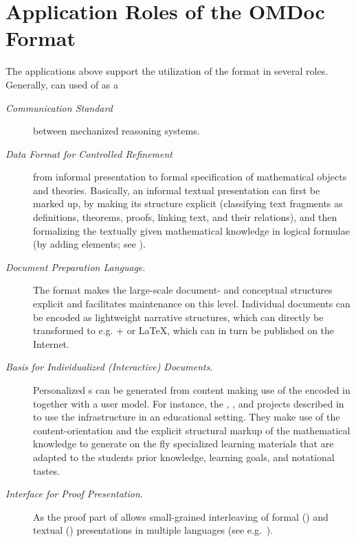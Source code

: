 \section{Application Roles of the OMDoc Format}\label{subsec:omdoc-roles}
  The applications above support the utilization of the {\omdoc} format in several
  roles. Generally, {\omdoc} can used of as a
\begin{description}
\item[\emph{Communication Standard}] between mechanized
reasoning systems.
\item[\emph{Data Format for Controlled Refinement}] from
  informal presentation to formal specification of mathematical objects and theories.
  Basically, an informal textual presentation can first be marked up, by making its
  structure explicit (classifying text fragments as
  definitions, theorems, proofs, linking text, and their relations), and then formalizing
  the textually given mathematical knowledge in logical formulae (by adding
  {} elements; see {}).
\item[\emph{Document Preparation Language}.]  The
  {\omdoc} format makes the large-scale document- and conceptual structures explicit and
  facilitates maintenance on this level. Individual documents can be encoded as
  lightweight narrative structures, which can directly be transformed to e.g.
  {\xhtml}+{\mathml} or {\LaTeX}, which can in turn be published on the Internet.
\item[\emph{Basis for Individualized (Interactive)
    Documents}.] Personalized
  {s} can be generated from {\mbase} content making use of
  the {} encoded in {\mbase} together with a user model.
  For instance, the {\mmiss}, {\MathDox}, and {\activemath} projects described in
  {} to {} use the {\omdoc} infrastructure in an educational
  setting. They make use of the content-orientation and the explicit structural markup of
  the mathematical knowledge to generate on the fly specialized learning materials that
  are adapted to the students prior knowledge, learning goals, and notational tastes.
\item[\emph{Interface for Proof Presentation}.] As the proof
  part of {\omdoc} allows small-grained interleaving of formal ({}) and
  textual ({}) presentations in multiple languages (see
  e.g.~\cite{HuangFiedler:pvip97,Fiedler:uacatp99}).
\end{description}


